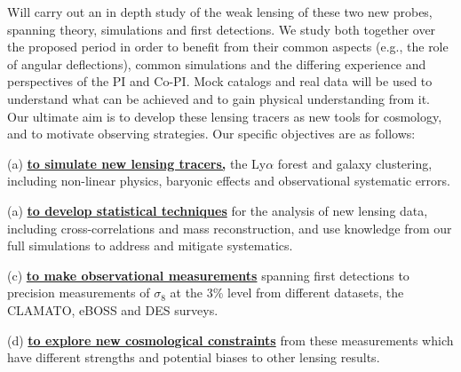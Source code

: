 Will carry out an in depth study of 
the weak lensing of these two new probes, spanning theory, 
simulations and first detections. 
We study both together over the proposed period in order to benefit from
their common aspects (e.g., the role of angular deflections), common
simulations and
the differing experience and perspectives of the PI and Co-PI.
Mock catalogs and  real 
data will be used
 to understand what can be achieved and to gain physical understanding
from it. Our ultimate aim is to develop these lensing tracers as new tools
for cosmology, and to motivate 
observing strategies.
Our specific objectives are as follows:

(a) {\bf \underline{to simulate new lensing tracers,}} the Ly$\alpha$ forest and galaxy clustering,
 including non-linear physics, baryonic effects and observational
systematic errors.

(a) {\bf \underline{to develop statistical techniques}} for the analysis of new lensing data, including 
cross-correlations and mass reconstruction, and use knowledge from our full simulations to address and mitigate systematics.


(c) {\bf \underline{to make observational measurements}} spanning first 
detections to precision measurements of $\sigma_{8}$ at the 3\% level 
from different datasets, the CLAMATO, eBOSS and DES surveys.

(d) {\bf \underline{to explore new cosmological constraints}} from these
measurements which have different strengths and potential biases  to other
lensing results.

